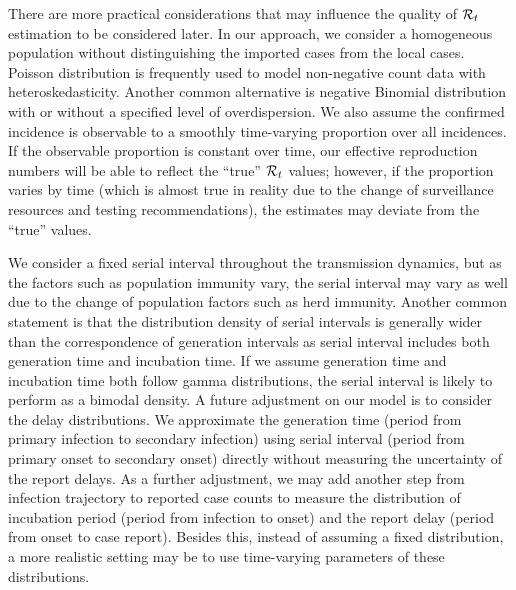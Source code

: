 


There are more practical considerations that may influence the quality of $\mathcal{R}_t$ estimation to be considered later. 
In our approach, we consider a homogeneous population without distinguishing the imported cases from the local cases. 
Poisson distribution is frequently used to model non-negative count data with heteroskedasticity. Another common alternative is negative Binomial distribution with or without a specified level of overdispersion. 
%
We also assume the confirmed incidence is observable to a smoothly time-varying proportion over all incidences. If the observable proportion is constant over time, our effective reproduction numbers will be able to reflect the ``true'' $\mathcal{R}_t$ values; however, if the proportion varies by time (which is almost true in reality due to the change of surveillance resources and testing recommendations), the estimates may deviate from the ``true'' values. 

We consider a fixed serial interval throughout the transmission dynamics, but as the factors such as population immunity vary, the serial interval may vary as well due to the change of population factors such as herd immunity. %
Another common statement is that the distribution density of serial intervals is generally wider than the correspondence of generation intervals as serial interval includes both generation time and incubation time. If we assume generation time and incubation time both follow gamma distributions, the serial interval is likely to perform as a bimodal density. 
A future adjustment on our model is to consider the delay distributions. We approximate the generation time (period from primary infection to secondary infection) using serial interval (period from primary onset to secondary onset) directly without measuring the uncertainty of the report delays. As a further adjustment, we may add another step from infection trajectory to reported case counts to measure the distribution of incubation period (period from infection to onset) and the report delay (period from onset to case report). Besides this, instead of assuming a fixed distribution, a more realistic setting may be to use time-varying parameters of these distributions. 

